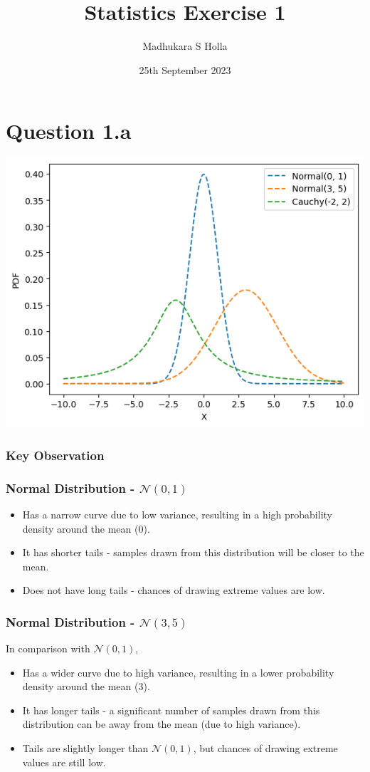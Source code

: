 \documentclass[12pt]{article}
\author{Madhukara S Holla}
\title{Statistics Exercise 1}
\date{25th September 2023}
\begin{document}
\maketitle
\newpage
\section*{Question 1.a}
\includegraphics[width=\linewidth]{graph1a}

\subsubsection*{Key Observation}

\subsubsection*{Normal Distribution - \(\mathcal{N}(0, 1)\)}
\begin{itemize}
    \item Has a narrow curve due to low variance, resulting in a high probability
    density around the mean (0).
    \item It has shorter tails - samples drawn from this distribution will be closer
    to the mean.
    \item Does not have long tails - chances of drawing extreme values are low.
\end{itemize}

\subsubsection*{Normal Distribution - \(\mathcal{N}(3, 5)\)}
In comparison with \(\mathcal{N}(0, 1)\),
\begin{itemize}
    \item Has a wider curve due to high variance, resulting in a lower probability
    density around the mean (3).
    \item It has longer tails - a significant number of samples drawn from this
    distribution can be away from the mean (due to high variance).
    \item Tails are slightly longer than \(\mathcal{N}(0, 1)\), but chances of
    drawing extreme values are still low.
\end{itemize}
\end{document}
